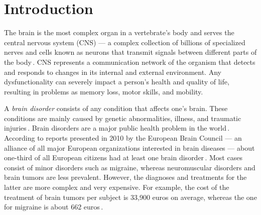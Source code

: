 \chapter{Introduction}
\label{chap:intro}


The brain is the most complex organ in a vertebrate's body and serves the central nervous system (CNS) --- a complex collection of billions of specialized nerves and cells known as neurons that transmit signals between different parts of the body\,\cite{Tortora-2018-Book-Principles,Lent-2004-Book-CemBilhoes}. CNS represents a communication network of the organism that detects and responds to changes in its internal and external environment. Any dysfunctionality can severely impact a person's health and quality of life, resulting in problems as memory loss, motor skills, and mobility.

A \emph{brain disorder} consists of any condition that affects one's brain. These conditions are mainly caused by genetic abnormalities, illness, and traumatic injuries\,\cite{Saladin-2016-Book-HumanAnatomy}. Brain disorders are a major public health problem in the world\,\cite{DiLuca-2014-BrainDisordesCosts}. According to reports presented in 2010 by the European Brain Council --- an alliance of all major European organizations interested in brain diseases --- about one-third of all European citizens had at least one brain disorder\,\cite{Olesen-2012-BrainDisordersCosts,DiLuca-2014-BrainDisordesCosts}. Most cases consist of minor disorders such as migraine, whereas neuromuscular disorders and brain tumors are less prevalent.  However, the diagnoses and treatments for the latter are more complex and very expensive. For example, the cost of the treatment of brain tumors per subject is 33,900 euros on average, whereas the one for migraine is about 662 euros\,\cite{DiLuca-2014-BrainDisordesCosts}.


